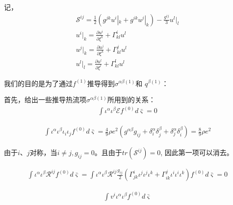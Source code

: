 \documentclass[MathematicsNumericsDerivationsAndOpenFOAM.tex]{subfiles}
\begin{document}
记，
\begin{equation}
  \begin{gathered}
    \mathcal{S}^{ij}=\frac{1}{2} (g^{jk} u^i|_k+g^{ik} u^j|_k) -\frac{g^{ij}}{3}u^l|_l\\
    u^i|_k= \frac{\partial u^i}{\partial \xi^k}+\Gamma_{kl}^i u^l\\
    u^j|_k= \frac{\partial u^j}{\partial \xi^k}+\Gamma_{kl}^j u^l\\
    u^l|_l= \frac{\partial u^l}{\partial \xi^l}+\Gamma_{kl}^l u^l
  \end{gathered}
\end{equation}


我们的目的是为了通过$f^{(1)}$推导得到$\sigma^{\alpha\beta(1)}$和 $q^{\beta (1)}$：


首先，给出一些推导热流项$ \sigma^{\alpha\beta(1)}$所用到的关系：
\begin{equation}
  \begin{gathered}
    \int \iota^\alpha \iota^\beta \mathcal{E} f^{(0)} d \bar{\varsigma}=0
  \end{gathered}
\end{equation}

\begin{equation}
  \begin{gathered}
    \int \iota^\alpha \iota^\beta \iota_i \iota_j  f^{(0)}  d \bar{\varsigma}=\frac{4}{9}\rho e^2 (g^{\alpha \beta}g_{ij}+\delta^{\alpha}_i \delta^{\beta}_j+\delta^{\alpha}_j \delta^{\beta}_i)=\frac{8}{9}\rho e^2
  \end{gathered}
\end{equation}

由于$i$、$j$对称，当$i\neq j,g_{ij}=0$。且由于$tr(\mathcal{S}^{ij})=0$, 因此第一项可以消去。

\begin{equation}
  \begin{gathered}
    \int \iota^\alpha \iota^\beta \mathcal{R}^{ij} f^{(0)}   d \bar{\varsigma}= \int \iota^\alpha \iota^\beta \mathcal{R}^{ij}  \frac{g_{ij}}{2}(\Gamma_{jk}^i \iota^j\iota^j\iota^k + \Gamma_{ik}^j \iota^i\iota^i\iota^k ) f^{(0)}  d \bar{\varsigma} =0
  \end{gathered}
\end{equation}

\begin{equation}
  \begin{gathered}
    \int v^i \iota^\alpha \iota^\beta  f^{(0)} d \bar{\varsigma}
  \end{gathered}
\end{equation}
\end{document}
